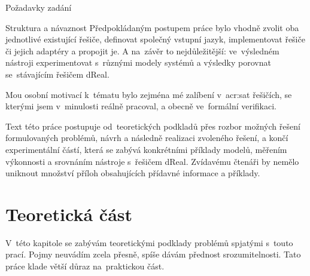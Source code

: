 \documentclass[thesis=M,czech]{FITthesis}[2012/06/26]
\newcommand{\acrlabel}[1]{acr:#1}
\newcommand{\acr}[1]{\acrshort{\acrlabel{#1}}}
\begin{document}
\begin{introduction}
\begin{section}{Požadavky zadání}

\end{section} %


\begin{section}{Struktura a návaznost}\label{s:intro:struct}
Předpokládaným postupem práce
bylo vhodně zvolit
oba jednotlivé existující řešiče,
definovat společný vstupní jazyk,
implementovat řešiče či jejich adaptéry
a propojit je.
A na~závěr to nejdůležitější:
ve~výsledném nástroji
experimentovat s~různými modely systémů
a výsledky porovnat se~stávajícím řešičem dReal.

Mou osobní motivací k~tématu bylo zejména mé zalíbení
v~\acr{sat} řešičích, se kterými jsem v~minulosti reálně pracoval,
a obecně ve~formální verifikaci.

Text této práce postupuje od~teoretických podkladů
přes rozbor možných řešení formulovaných problémů,
návrh a následně realizaci zvoleného řešení,
a končí experimentální částí,
která se zabývá konkrétními příklady modelů,
měřením výkonnosti a srovnáním nástroje s~řešičem dReal.
Zvídavému čtenáři by nemělo uniknout
množství příloh obsahujících
přídavné informace a příklady.
\end{section} %


\end{introduction}



\chapter{Teoretická část}\label{ch:theory}
V~této kapitole se zabývám
teoretickými podklady problémů spjatými s~touto prací.
Pojmy neuvádím zcela přesně,
spíše dávám přednost srozumitelnosti.
Tato práce klade větší důraz na~praktickou část.

\end{document}
